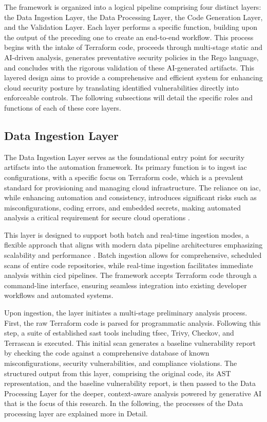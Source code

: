 The framework is organized into a logical pipeline comprising four distinct layers: the Data Ingestion Layer, the Data Processing Layer, the Code Generation Layer, and the Validation Layer. Each layer performs a specific function, building upon the output of the preceding one to create an end-to-end workflow. This process begins with the intake of Terraform code, proceeds through multi-stage static and AI-driven analysis, generates preventative security policies in the Rego language, and concludes with the rigorous validation of these AI-generated artifacts. This layered design aims to provide a comprehensive and efficient system for enhancing cloud security posture by translating identified vulnerabilities directly into enforceable controls. The following subsections will detail the specific roles and functions of each of these core layers.

\subsection{Data Ingestion Layer} %
\label{sec:Data Ingestion Layer}

The Data Ingestion Layer serves as the foundational entry point for security artifacts into the automation framework. Its primary function is to ingest \gls{iac} configurations, with a specific focus on Terraform code, which is a prevalent standard for provisioning and managing cloud infrastructure. The reliance on \gls{iac}, while enhancing automation and consistency, introduces significant risks such as misconfigurations, coding errors, and embedded secrets, making automated analysis a critical requirement for secure cloud operations \cite{hayagreevan_security_2024}.

This layer is designed to support both batch and real-time ingestion modes, a flexible approach that aligns with modern data pipeline architectures emphasizing scalability and performance \cite{ismail_big_2025}. Batch ingestion allows for comprehensive, scheduled scans of entire code repositories, while real-time ingestion facilitates immediate analysis within \gls{cicd} pipelines. The framework accepts Terraform code through a command-line interface, ensuring seamless integration into existing developer workflows and automated systems.

Upon ingestion, the layer initiates a multi-stage preliminary analysis process. First, the raw Terraform code is parsed for programmatic analysis. Following this step, a suite of established \gls{sast} tools including tfsec, Trivy, Checkov, and Terrascan is executed. This initial scan generates a baseline vulnerability report by checking the code against a comprehensive database of known misconfigurations, security vulnerabilities, and compliance violations. The structured output from this layer, comprising the original code, its AST representation, and the baseline vulnerability report, is then passed to the Data Processing Layer for the deeper, context-aware analysis powered by generative AI that is the focus of this research. In the following, the processes of the Data processing layer are explained more in Detail.

